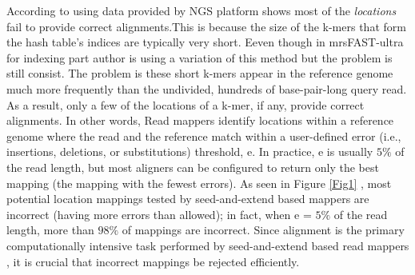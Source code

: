 According to \cite{fasthash} using data provided by NGS platform shows most of the \textit{locations} fail to provide correct alignments.This is because the size of the k-mers that form the hash table’s indices are typically very short. Eeven though in mrsFAST-ultra\cite{mrsfastultra} for indexing part author is using a variation of this method but the problem is still consist. The problem is these short k-mers appear in the reference genome much more frequently than the undivided, hundreds of base-pair-long query read. As a result, only a few of the locations of a k-mer, if any, provide correct alignments. In other words, Read mappers identify locations within a reference genome where the read and the reference match within a user-defined error (i.e., insertions, deletions, or substitutions) threshold, e. In practice, e is usually $5\%$ of the read length, but most aligners can be configured to return only the best mapping (the mapping with the fewest errors). As seen in Figure \ref{Fig1} \cite{shd}, most potential location mappings tested by seed-and-extend based mappers are incorrect (having more errors than allowed); in fact, when e = $5\%$ of the read length, more than $98\%$ of mappings are incorrect. Since alignment is the primary computationally intensive task performed by seed-and-extend based read mappers \cite{fasthash}, it is crucial that incorrect mappings be rejected efficiently. 
  
  
  
  
  
  
  
  
  
  
  